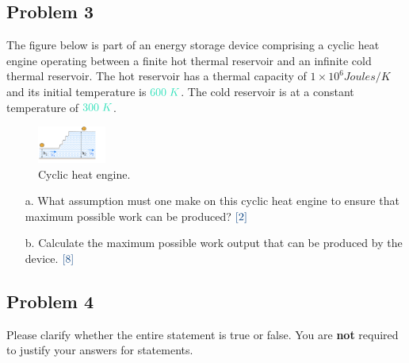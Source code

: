 \documentclass[
  twocolumn,
  landscape]{report}
\begin{document}
\hfill\break

\vspace{4 cm}

\hypertarget{problem-3}{%
\subsection{Problem 3}\label{problem-3}}

The figure below is part of an energy storage device comprising a cyclic
heat engine operating between a finite hot thermal reservoir and an
infinite cold thermal reservoir. The hot reservoir has a thermal
capacity of \(1 \times 10^{6} Joules / K\) and its initial temperature
is \({\color[rgb]{0.164799,0.878862,0.723179}600 \; K}\). The cold
reservoir is at a constant temperature of
\({\color[rgb]{0.164799,0.878862,0.723179}300 \; K}\).

\begin{figure}[h]
    \centering
    \includegraphics[width=0.2\textwidth]{images/image_1.png}
    \caption{Cyclic heat engine.}
    \label{fig:enter-label}
\end{figure}

\begin{enumerate}
\item[a.] What assumption must one make on this cyclic heat engine to ensure that maximum possible work can be produced? ${\color[rgb]{0.028509,0.250925,0.501969}[2]}$
\vspace{1 cm}
\item[b.] Calculate the maximum possible work output that can be produced by the device.  ${\color[rgb]{0.028509,0.250925,0.501969}[8]}$
\\
\vspace{8 cm}
\end{enumerate}

\hfill\break

\vspace{4 cm}

\hypertarget{problem-4}{%
\subsection{Problem 4}\label{problem-4}}

Please clarify whether the entire statement is true or false. You are
\textbf{not} required to justify your answers for statements.
\end{document}
